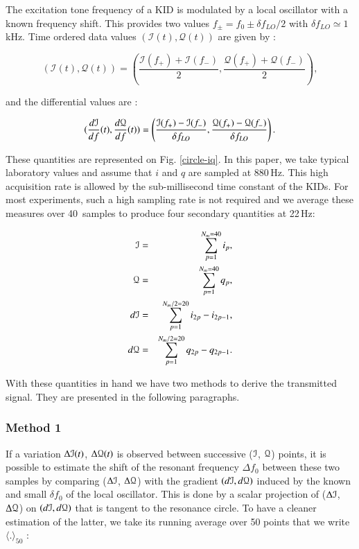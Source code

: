 The excitation tone frequency of a KID is modulated by a local oscillator with a
known frequency shift. This provides two values $f_{\pm} = f_0 \pm \delta
  f_{LO}/2$ with $\delta f_{LO} \simeq 1$\,kHz. Time ordered data values $(\mathcal{I}(t),\mathcal{Q}(t))$ are given by :

\begin{equation}
(\mathcal{I}(t), \mathcal{Q}(t)) = (\frac{\mathcal{I}(f_{+}) +
    \mathcal{I}(f_{-})}{2},
\frac{\mathcal{Q}(f_{+}) + \mathcal{Q}(f_{-})}{2}),
\end{equation}

and the differential values are :

\begin{equation}
\label{gradient}
(\frac{d\mathcal{I}}{df}(t), \frac{d\mathcal{Q}}{df}(t)) =
\left(\frac{\mathcal{I}(f_{+}) - \mathcal{I}(f_{-})}{\delta f_{LO}},
\frac{\mathcal{Q}(f_{+}) - \mathcal{Q}(f_{-})}{\delta f_{LO}}\right).
\end{equation}

These quantities are represented on Fig. \ref{circle-iq}. In this paper, we take
typical laboratory values and assume that $i$ and $q$ are sampled at
880\,Hz. This high acquisition rate is allowed by the sub-millisecond time
constant of the KIDs. For most experiments, such a high sampling rate is not
required and we average these measures over 40~samples to produce
four secondary quantities at 22\,Hz:

\begin{eqnarray}
\mathcal{I}  &=& \sum^{N_{m}=40}_{p=1} i_{p},\\
\mathcal{Q}  &=& \sum^{N_{m}=40}_{p=1} q_{p},\\
d\mathcal{I} &=& \sum^{N_{m}/2=20}_{p=1} i_{2p} - i_{2p-1},\\
d\mathcal{Q} &=& \sum^{N_{m}/2=20}_{p=1} q_{2p} - q_{2p-1}.
\end{eqnarray}

With these quantities in hand we have two methods to derive the transmitted
signal. They are presented in the following paragraphs.

\subsubsection{Method 1}
If a variation $\Delta\mathcal{I}(t)$, $\Delta\mathcal{Q}(t)$ is observed between successive ($\mathcal{I}$,
$\mathcal{Q}$) points, it is possible to estimate the shift of the resonant frequency
$\Delta f_{0}$ between these two samples by comparing ($\Delta \mathcal{I}$, $\Delta \mathcal{Q}$)
with the gradient $(d\mathcal{I},d\mathcal{Q})$ induced by the known and small $\delta
f_{0}$ of the local oscillator. This is done by a scalar projection of ($\Delta\mathcal{I}$,
$\Delta\mathcal{Q}$) on $(d\mathcal{I},d\mathcal{Q})$ that is tangent to the resonance circle. To have a
cleaner estimation of the latter, we take its running average over 50
points that we write $\langle . \rangle_{50}$ \citep{2014A&A...569A...9C}:


